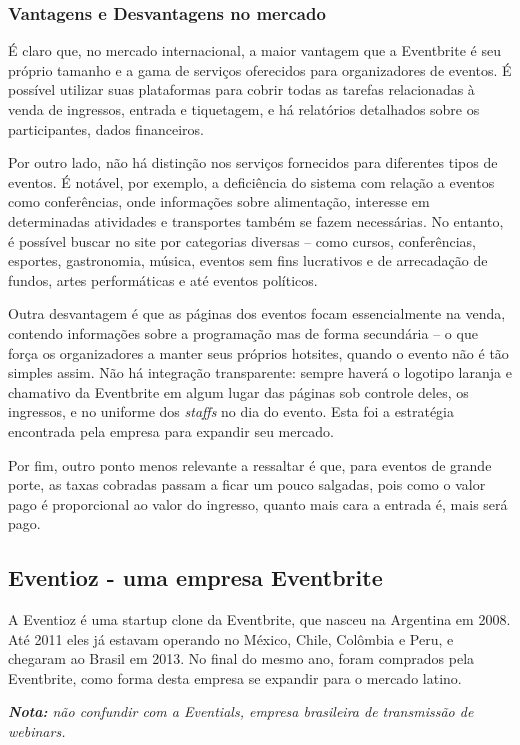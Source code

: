\documentclass[12pt,a4paper,twoside,hyphens,english,brazil]{abntex2}
\begin{document}
\subsubsection*{Vantagens e Desvantagens no mercado}
É claro que, no mercado internacional, a maior vantagem que a Eventbrite é seu próprio tamanho e a gama de serviços oferecidos para organizadores de eventos. É possível utilizar suas plataformas para cobrir todas as tarefas relacionadas à venda de ingressos, entrada e tiquetagem, e há relatórios detalhados sobre os participantes, dados financeiros.

Por outro lado, não há distinção nos serviços fornecidos para diferentes tipos de eventos. É notável, por exemplo, a deficiência do sistema com relação a eventos como conferências, onde informações sobre alimentação, interesse em determinadas atividades e transportes também se fazem necessárias\cite{eventbrite-review}. No entanto, é possível buscar no site por categorias diversas -- como cursos, conferências, esportes, gastronomia, música, eventos sem fins lucrativos e de arrecadação de fundos, artes performáticas e até eventos políticos.

Outra desvantagem é que as páginas dos eventos focam essencialmente na venda, contendo informações sobre a programação mas de forma secundária -- o que força os organizadores a manter seus próprios hotsites, quando o evento não é tão simples assim. Não há integração transparente: sempre haverá o logotipo laranja e chamativo da Eventbrite em algum lugar das páginas sob controle deles, os ingressos, e no uniforme dos \emph{staffs} no dia do evento. Esta foi a estratégia encontrada pela empresa para expandir seu mercado.

Por fim, outro ponto menos relevante a ressaltar é que, para eventos de grande porte, as taxas cobradas passam a ficar um pouco salgadas, pois como o valor pago é proporcional ao valor do ingresso, quanto mais cara a entrada é, mais será pago.


\subsection{Eventioz - uma empresa Eventbrite}
A Eventioz é uma startup clone da Eventbrite, que nasceu na Argentina em 2008. Até 2011 eles já estavam operando no México, Chile, Colômbia e Peru, e chegaram ao Brasil em 2013. No final do mesmo ano, foram comprados pela Eventbrite, como forma desta empresa se expandir para o mercado latino.

\emph{\textbf{Nota:} não confundir com a Eventials, empresa brasileira de transmissão de webinars.}
\end{document}
